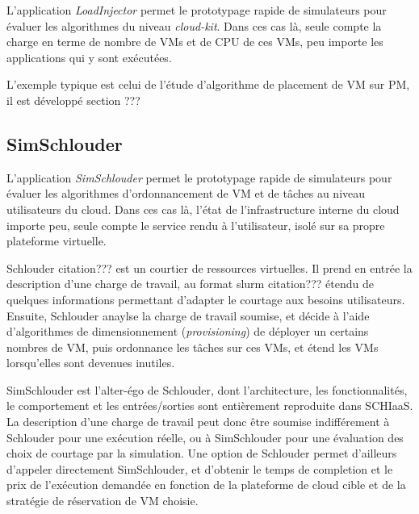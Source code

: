 \documentclass[parallelisme]{compas2017}
\begin{document}
L'application \emph{LoadInjector} permet le prototypage rapide de simulateurs pour évaluer les 
algorithmes du niveau \textit{cloud-kit}. Dans ces cas là, seule compte la charge en terme de nombre 
de VMs et de CPU de ces VMs, peu importe les applications qui y sont exécutées.

L'exemple typique est celui de l'étude d'algorithme de placement de VM sur PM, il est développé section ???

\subsection{SimSchlouder}

L'application \emph{SimSchlouder} permet le prototypage rapide de simulateurs pour évaluer les 
algorithmes d'ordonnancement de VM et de tâches au niveau utilisateurs du cloud. 
Dans ces cas là, l'état de l'infrastructure interne du cloud importe peu, seule compte le service 
rendu à l'utilisateur, isolé sur sa propre plateforme virtuelle. 

Schlouder citation??? est un courtier de ressources virtuelles. Il prend en entrée la description 
d'une charge de travail, au format slurm citation??? étendu de quelques informations permettant 
d'adapter le courtage aux besoins utilisateurs. Ensuite, Schlouder anaylse la charge de travail 
soumise, et décide à l'aide d'algorithmes de dimensionnement (\textit{provisioning}) de déployer 
un certains nombres de VM, puis ordonnance les tâches sur ces VMs, et étend les VMs lorsqu'elles
sont devenues inutiles.

SimSchlouder est l'alter-égo de Schlouder, dont l'architecture, les fonctionnalités, le comportement
et les entrées/sorties sont entièrement reproduite dans SCHIaaS. La description d'une charge de 
travail peut donc être soumise indifférement à Schlouder pour une exécution réelle, ou à SimSchlouder
pour une évaluation des choix de courtage par la simulation. Une option de Schlouder permet 
d'ailleurs d'appeler directement SimSchlouder, et d'obtenir le temps de completion et le prix 
de l'exécution demandée en fonction de la plateforme de cloud cible et de la stratégie de réservation
de VM choisie.
\end{document}
